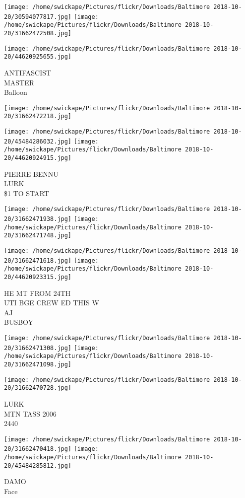 \documentclass[10pt,letterpaper]{article}
\begin{document}
\texttt{[image: /home/swickape/Pictures/flickr/Downloads/Baltimore 2018-10-20/30594077817.jpg]}
\texttt{[image: /home/swickape/Pictures/flickr/Downloads/Baltimore 2018-10-20/31662472508.jpg]}

\vspace{0.25in}
\texttt{[image: /home/swickape/Pictures/flickr/Downloads/Baltimore 2018-10-20/44620925655.jpg]}

ANTIFASCIST\\
MASTER\\
Balloon\\
\pagebreak

\texttt{[image: /home/swickape/Pictures/flickr/Downloads/Baltimore 2018-10-20/31662472218.jpg]}

\vspace{0.25in}
\texttt{[image: /home/swickape/Pictures/flickr/Downloads/Baltimore 2018-10-20/45484286032.jpg]}
\texttt{[image: /home/swickape/Pictures/flickr/Downloads/Baltimore 2018-10-20/44620924915.jpg]}

PIERRE BENNU\\
LURK\\
\$1 TO START\\
\pagebreak

\texttt{[image: /home/swickape/Pictures/flickr/Downloads/Baltimore 2018-10-20/31662471938.jpg]}
\texttt{[image: /home/swickape/Pictures/flickr/Downloads/Baltimore 2018-10-20/31662471748.jpg]}

\texttt{[image: /home/swickape/Pictures/flickr/Downloads/Baltimore 2018-10-20/31662471618.jpg]}
\texttt{[image: /home/swickape/Pictures/flickr/Downloads/Baltimore 2018-10-20/44620923315.jpg]}

HE MT FROM 24TH\\
UTI BGE CREW ED THIS W\\
AJ\\
BUSBOY\\
\pagebreak

\texttt{[image: /home/swickape/Pictures/flickr/Downloads/Baltimore 2018-10-20/31662471308.jpg]}
\texttt{[image: /home/swickape/Pictures/flickr/Downloads/Baltimore 2018-10-20/31662471098.jpg]}

\vspace{0.25in}
\texttt{[image: /home/swickape/Pictures/flickr/Downloads/Baltimore 2018-10-20/31662470728.jpg]}

LURK\\
MTN TASS 2006\\
2440\\
\pagebreak

\texttt{[image: /home/swickape/Pictures/flickr/Downloads/Baltimore 2018-10-20/31662470418.jpg]}
\texttt{[image: /home/swickape/Pictures/flickr/Downloads/Baltimore 2018-10-20/45484285812.jpg]}

DAMO\\
Face\\
\pagebreak
\end{document}
